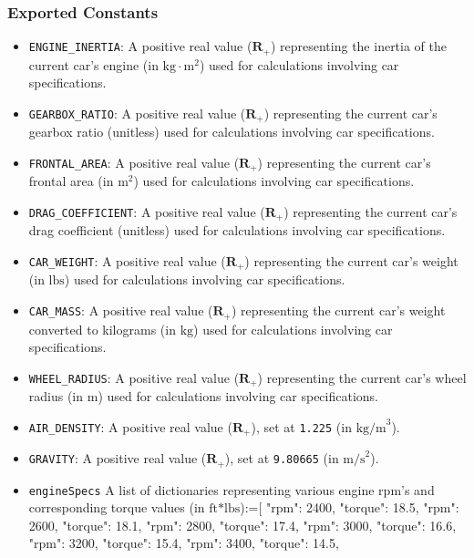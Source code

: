 \documentclass[12pt, titlepage]{article}
\begin{document}
\subsubsection{Exported Constants}

\begin{itemize}
  \item \texttt{ENGINE\_INERTIA}: A positive real value ($\mathbf{R}_{+}$) representing the inertia of the current car's engine (in $\text{kg}\cdot\text{m}^2$) used for calculations involving car specifications.
  \item \texttt{GEARBOX\_RATIO}: A positive real value ($\mathbf{R}_{+}$) representing the current car's gearbox ratio (unitless) used for calculations involving car specifications.
  \item \texttt{FRONTAL\_AREA}: A positive real value ($\mathbf{R}_{+}$) representing the current car's frontal area (in $\text{m}^2$) used for calculations involving car specifications.
  \item \texttt{DRAG\_COEFFICIENT}: A positive real value ($\mathbf{R}_{+}$) representing the current car's drag coefficient (unitless) used for calculations involving car specifications.
  \item \texttt{CAR\_WEIGHT}: A positive real value ($\mathbf{R}_{+}$) representing the current car's weight (in $\text{lbs}$) used for calculations involving car specifications.
  \item \texttt{CAR\_MASS}: A positive real value ($\mathbf{R}_{+}$) representing the current car's weight converted to kilograms (in $\text{kg}$) used for calculations involving car specifications.
  \item \texttt{WHEEL\_RADIUS}: A positive real value ($\mathbf{R}_{+}$) representing the current car's wheel radius (in $\text{m}$) used for calculations involving car specifications.
  \item \texttt{AIR\_DENSITY}: A positive real value ($\mathbf{R}_{+}$), set at \texttt{1.225} (in $\text{kg/m}^3$).
  \item \texttt{GRAVITY}: A positive real value ($\mathbf{R}_{+}$), set at \texttt{9.80665} (in $\text{m/s}^2$).
  \item \texttt{engineSpecs} A list of dictionaries representing various engine rpm's and corresponding torque values (in $\text{ft*lbs}$):=[
    {"rpm": 2400, "torque": 18.5},
    {"rpm": 2600, "torque": 18.1},
    {"rpm": 2800, "torque": 17.4},
    {"rpm": 3000, "torque": 16.6},
    {"rpm": 3200, "torque": 15.4},
    {"rpm": 3400, "torque": 14.5},

\end{itemize}
\end{document}
